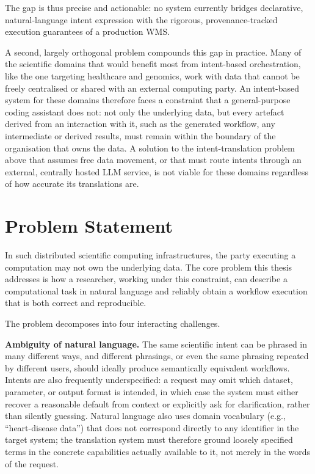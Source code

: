 The gap is thus precise and actionable: no system currently bridges declarative,
natural-language intent expression with the rigorous, provenance-tracked
execution guarantees of a production WMS.

A second, largely orthogonal problem compounds this gap in practice. Many of
the scientific domains that would benefit most from intent-based orchestration, 
like the one targeting healthcare and genomics, work with data that cannot be freely centralised
or shared with an external computing party. An intent-based system for these
domains therefore faces a constraint that a general-purpose coding assistant
does not: not only the underlying data, but every artefact derived from an
interaction with it, such as the generated workflow, any intermediate or derived
results, must remain within the boundary of the organisation that owns the
data. A solution to the intent-translation problem above that assumes free
data movement, or that must route intents through an external, centrally
hosted LLM service, is not viable for these domains regardless of how accurate
its translations are.

\section{Problem Statement}

In such distributed scientific computing infrastructures, the party executing
a computation may not own the underlying data. The core problem this thesis
addresses is how a researcher, working under this constraint, can describe a
computational task in natural language and reliably obtain a workflow
execution that is both correct and reproducible.

The problem decomposes into four interacting challenges.

\textbf{Ambiguity of natural language.} The same scientific intent can be
phrased in many different ways, and different phrasings, or even the same
phrasing repeated by different users, should ideally produce semantically
equivalent workflows. Intents are also frequently underspecified: a request
may omit which dataset, parameter, or output format is intended, in which
case the system must either recover a reasonable default from context or
explicitly ask for clarification, rather than silently guessing. Natural
language also uses domain vocabulary (e.g., ``heart-disease data'') that does
not correspond directly to any identifier in the target system; the translation system must therefore ground
loosely specified terms in the concrete capabilities actually available to it,
not merely in the words of the request.

